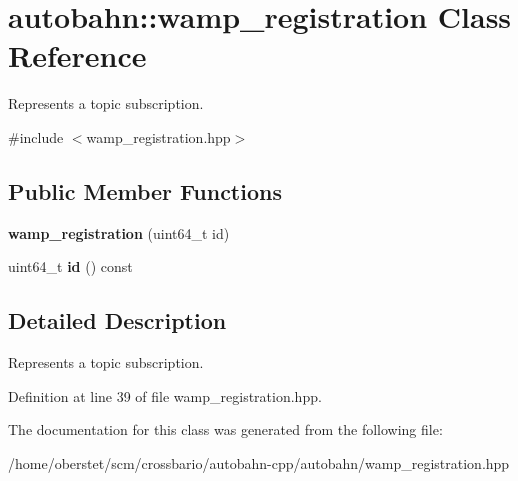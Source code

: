 \hypertarget{classautobahn_1_1wamp__registration}{}\section{autobahn\+:\+:wamp\+\_\+registration Class Reference}
\label{classautobahn_1_1wamp__registration}


Represents a topic subscription.  




{\ttfamily \#include $<$wamp\+\_\+registration.\+hpp$>$}

\subsection*{Public Member Functions}
\begin{DoxyCompactItemize}
\item 
{\bfseries wamp\+\_\+registration} (uint64\+\_\+t id)\hypertarget{classautobahn_1_1wamp__registration_aff6441843d9e47f493bb1fd6eee7d24b}{}\label{classautobahn_1_1wamp__registration_aff6441843d9e47f493bb1fd6eee7d24b}

\item 
uint64\+\_\+t {\bfseries id} () const \hypertarget{classautobahn_1_1wamp__registration_aa169a481a948af614f6846c4a7b3f3b0}{}\label{classautobahn_1_1wamp__registration_aa169a481a948af614f6846c4a7b3f3b0}

\end{DoxyCompactItemize}


\subsection{Detailed Description}
Represents a topic subscription. 

Definition at line 39 of file wamp\+\_\+registration.\+hpp.



The documentation for this class was generated from the following file\+:\begin{DoxyCompactItemize}
\item 
/home/oberstet/scm/crossbario/autobahn-\/cpp/autobahn/wamp\+\_\+registration.\+hpp\end{DoxyCompactItemize}
